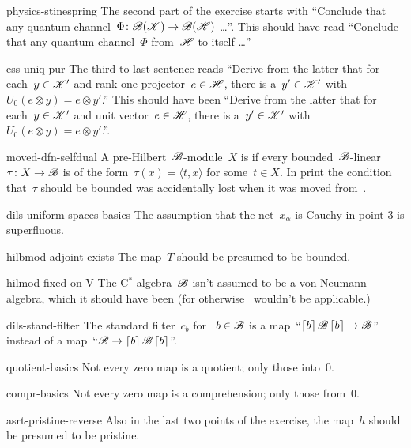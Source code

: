\begin{erratum}{physics-stinespring}%
The second part of the exercise starts with
    ``Conclude that any quantum channel~$\Phi\colon \mathscr{B}(\mathscr{K}) \to \mathscr{B}(\mathscr{H})$ \ldots''.
This should have read
    ``Conclude that any quantum channel~$\Phi$ from~$\mathscr{H}$ to itself \ldots''
\end{erratum}
\begin{erratum}{ess-uniq-pur}%
The third-to-last sentence reads
``Derive from the latter
that for each~$y \in \mathscr{K}'$ and rank-one projector~$e \in \mathscr{H}$,
there is a~$y' \in \mathscr{K}'$
with~$U_0 (e \otimes y) = e \otimes y'$.''
This should have been
``Derive from the latter
that for each~$y \in \mathscr{K}'$ and unit vector~$e \in \mathscr{H}$,
there is a~$y' \in \mathscr{K}'$
with~$U_0 (e \otimes y) = e \otimes y'$.''.
\end{erratum}
\begin{erratum}{moved-dfn-selfdual}%
    A pre-Hilbert~$\mathscr{B}$-module~$X$ is 
    if every bounded~$\mathscr{B}$-linear~$\tau \colon X \to \mathscr{B}$
    is of the form~$\tau(x) = \langle t, x\rangle$ for some~$t \in X$.
In print the condition that~$\tau$ should be bounded
        was accidentally lost when it was moved from~.
\end{erratum}
\begin{erratum}{dils-uniform-spaces-basics}%
The assumption  that the net~$x_\alpha$ is Cauchy in point 3
    is superfluous.
\end{erratum}
\begin{erratum}{hilbmod-adjoint-exists}%
The map~$T$ should be presumed to be bounded.
\end{erratum}
\begin{erratum}{hilmod-fixed-on-V}%
The C$^*$-algebra~$\mathscr{B}$ isn't assumed to be a von Neumann algebra,
    which it should have been (for otherwise~ wouldn't
    be applicable.)
\end{erratum}
\begin{erratum}{dils-stand-filter}%
The standard filter~$c_b$ for ~$b \in \mathscr{B}$
    is a map~``$\left\lceil b\right\rceil \mathscr{B} \left\lceil b\right\rceil \to \mathscr{B}$''
    instead of a map~``$\mathscr{B} \to \left\lceil b\right\rceil \mathscr{B} \left\lceil b\right\rceil$''.
\end{erratum}
\begin{erratum}{quotient-basics}%
Not every zero map is a quotient; only those into~$0$.
\end{erratum}
\begin{erratum}{compr-basics}%
Not every zero map is a comprehension; only those from~$0$.
\end{erratum}
\begin{erratum}{asrt-pristine-reverse}%
Also in the last two points of the exercise,
    the map~$h$ should be presumed to be pristine.
\end{erratum}

